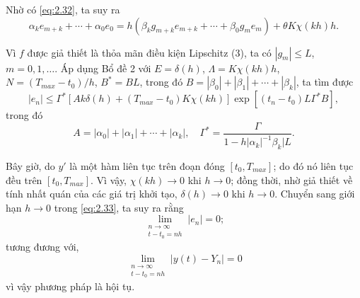 Nhờ có \eqref{eq:2.32}, ta suy ra
\begin{equation*}
    \alpha_k e_{m+k} + \cdots + \alpha_0 e_0 = h(\beta_k g_{m+k} e_{m+k} + \cdots + \beta_0 g_m e_m) + \theta K \chi(kh) h .
\end{equation*}

Vì $f$ được giả thiết là thỏa mãn điều kiện Lipschitz (3), ta có $|g_m| \le L$, $m = 0, 1, \dots$. Áp dụng Bổ đề 2 với $E = \delta(h)$, $\Lambda = K \chi(kh) h$, $N = (T_{max} - t_0)/h$, $B^* = BL$, trong đó $B = |\beta_0| + |\beta_1| + \cdots + |\beta_k|$, ta tìm được
\begin{equation}
    |e_n| \le \Gamma^* \left[ A k \delta(h) + (T_{max} - t_0) K \chi(kh) \right] \exp \left[ (t_n - t_0) L \Gamma^* B \right] , \tag{2.33} \label{eq:2.33}
\end{equation}
trong đó
\begin{equation*}
    A = |\alpha_0| + |\alpha_1| + \cdots + |\alpha_k| , \quad \Gamma^* = \frac{\Gamma}{1 - h|\alpha_k|^{-1}\beta_k| L} .
\end{equation*}

Bây giờ, do $y'$ là một hàm liên tục trên đoạn đóng $[t_0, T_{max}]$; do đó nó liên tục đều trên $[t_0, T_{max}]$. Vì vậy, $\chi(kh) \to 0$ khi $h \to 0$; đồng thời, nhờ giả thiết về tính nhất quán của các giá trị khởi tạo, $\delta(h) \to 0$ khi $h \to 0$. Chuyển sang giới hạn $h \to 0$ trong \eqref{eq:2.33}, ta suy ra rằng
\begin{equation*}
    \lim_{\substack{n \to \infty \\ t - t_0 = nh}} |e_n| = 0 ;
\end{equation*}
tương đương với,
\begin{equation*}
    \lim_{\substack{n \to \infty \\ t - t_0 = nh}} |y(t) - Y_n| = 0
\end{equation*}
vì vậy phương pháp là hội tụ.

